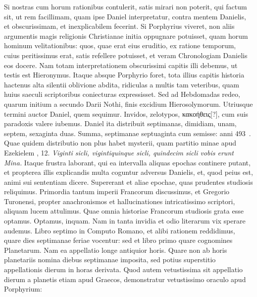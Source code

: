 Si nostras cum horum
rationibus contulerit, satis mirari non poterit, qui factum
sit, ut rem facillimam, quam ipse Daniel interpretatur, contra mentem
Danielis, et obscurissimam, et inexplicabilem fecerint.
Si Porphyrius
viveret, non aliis argumentis magis religionis Christianae
initia oppugnare potuisset, quam horum hominum velitationibus:
quos, quae erat eius eruditio, ex ratione temporum, cuius peritissimus
erat, satis refellere potuisset, et veram Chronologiam
Danielis eos docere.
Nam totam interpretationem obscurissimi
capitis  illi debemus, ut testis est Hieronymus.
Itaque
absque Porphyrio foret, tota illius capitis historia hactenus alta
silentii oblivione abdita, ridiculas a multis tam veteribus, quam huius
saeculi scriptoribus coniecturas expressisset.
Sed ad Hebdomadas
redeo, quarum initium a secundo Darii Nothi, finis excidium
Hierosolymorum.
Utriusque termini auctor Daniel, quem sequimur.
Invidos, zelotypos, \textgreek{κακοήθεις[?]}, cum suis
 paradoxis valere iubemus.
Daniel ita distribuit septimanas, dimidiam, unam, septem,
sexaginta duas.
Summa, septimanae septuaginta cum semisse: anni
493~.
Quae quidem distributio non plus habet mysterii, quam
partitio minae apud Ezekielem , 12.
\textit{Viginti sicli, vigintiquinque
sicli, quindecim sicli vobis erunt Mina.}
Itaque frustra laborant,
qui ea intervalla aliquas epochas continere putant, et propterea
illis explicandis multa coguntur adversus Danielis, et, quod peius
est, animi sui sententiam dicere.
Supererant et aliae epochae, quas
prudentes studiosis reliquimus.
Primordia tantum imperii Francorum
discussimus, et Gregorio Turonensi, propter anachronismos
et hallucinationes intricatissimo scriptori, aliquam lucem attulimus.
Quae omnia historiae Francorum studiosis grata esse optamus.
Optamus, inquam.
Nam in tanta invidia et odio literarum
vix sperare audemus.
Libro septimo in Computo Romano, et alibi
rationem reddidimus, quare dies septimanae feriae vocentur: sed
et libro primo quare cognomines Planetarum.
Nam ea appellatio longe antiquior horis.
Quare non ab horis planetariis nomina diebus
septimanae imposita, sed potius superstitio appellationis dierum
in horas derivata.
Quod autem vetustissima sit appellatio dierum
a planetis etiam apud Graecos, demonstratur vetustissimo oraculo
apud Porphyrium:
